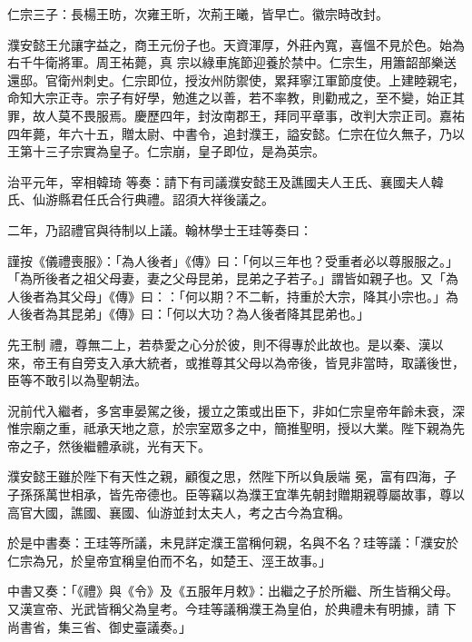 \begin{pinyinscope}
 仁宗三子：長楊王昉，次雍王昕，次荊王曦，皆早亡。徽宗時改封。



 濮安懿王允讓字益之，商王元份子也。天資渾厚，外莊內寬，喜慍不見於色。始為右千牛衛將軍。周王祐薨，真
 宗以綠車旄節迎養於禁中。仁宗生，用簫韶部樂送還邸。官衛州刺史。仁宗即位，授汝州防禦使，累拜寧江軍節度使。上建睦親宅，命知大宗正寺。宗子有好學，勉進之以善，若不率教，則勸戒之，至不變，始正其罪，故人莫不畏服焉。慶歷四年，封汝南郡王，拜同平章事，改判大宗正司。嘉祐四年薨，年六十五，贈太尉、中書令，追封濮王，謚安懿。仁宗在位久無子，乃以王第十三子宗實為皇子。仁宗崩，皇子即位，是為英宗。



 治平元年，宰相韓琦
 等奏：請下有司議濮安懿王及譙國夫人王氏、襄國夫人韓氏、仙游縣君任氏合行典禮。詔須大祥後議之。



 二年，乃詔禮官與待制以上議。翰林學士王珪等奏曰：



 謹按《儀禮喪服》：「為人後者」《傳》曰：「何以三年也？受重者必以尊服服之。」「為所後者之祖父母妻，妻之父母昆弟，昆弟之子若子。」謂皆如親子也。又「為人後者為其父母」《傳》曰：：「何以期？不二斬，持重於大宗，降其小宗也。」為人後者為其昆弟」《傳》曰：「何以大功？為人後者降其昆弟也。」



 先王制
 禮，尊無二上，若恭愛之心分於彼，則不得專於此故也。是以秦、漢以來，帝王有自旁支入承大統者，或推尊其父母以為帝後，皆見非當時，取議後世，臣等不敢引以為聖朝法。



 況前代入繼者，多宮車晏駕之後，援立之策或出臣下，非如仁宗皇帝年齡未衰，深惟宗廟之重，祗承天地之意，於宗室眾多之中，簡推聖明，授以大業。陛下親為先帝之子，然後繼體承祧，光有天下。



 濮安懿王雖於陛下有天性之親，顧復之思，然陛下所以負扆端
 冕，富有四海，子子孫孫萬世相承，皆先帝德也。臣等竊以為濮王宜準先朝封贈期親尊屬故事，尊以高官大國，譙國、襄國、仙游並封太夫人，考之古今為宜稱。



 於是中書奏：王珪等所議，未見詳定濮王當稱何親，名與不名？珪等議：「濮安於仁宗為兄，於皇帝宜稱皇伯而不名，如楚王、涇王故事。」



 中書又奏：「《禮》與《令》及《五服年月敕》：出繼之子於所繼、所生皆稱父母。又漢宣帝、光武皆稱父為皇考。今珪等議稱濮王為皇伯，於典禮未有明據，請
 下尚書省，集三省、御史臺議奏。」




\end{pinyinscope}
